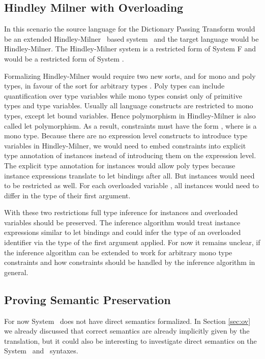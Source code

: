 \subsection{Hindley Milner with Overloading}\label{sec:hm}
In this scenario the source language for the Dictionary Passing Transform would be an extended Hindley-Milner~\cite{hm} based system \HMo\ and the target language would be Hindley-Milner. 
The Hindley-Milner system is a restricted form of System F and \HMo would be a restricted form of System \Fo. 

\noindent Formalizing Hindley-Milner would require two new sorts,  and  for mono and poly types, in favour of the sort for arbitrary types . 
Poly types can include quantification over type variables while mono types consist only of primitive types and type variables. 
Usually all language constructs are restricted to mono types, except let bound variables. 
Hence polymorphism in Hindley-Milner is also called let polymorphism.  
As a result, constraints must have the form  \Constr{:} , where  is a mono type. 
Because there are no expression level constructs to introduce type variables in Hindley-Milner, we would need to embed constraints into explicit type annotation of instances instead of introducing them on the expression level. 
The explicit type annotation for instances would allow poly types because instance expressions translate to let bindings after all.
But instances would need to be restricted as well. 
For each overloaded variable , all instances would need to differ in the type of their first argument.

\noindent With these two restrictions full type inference for instances and overloaded variables should be preserved.
The inference algorithm would treat instance expressions similar to let bindings and could infer the type of an overloaded identifier via the type of the first argument applied. 
For now it remains unclear, if the inference algorithm can be extended to work for arbitrary mono type constraints and how constraints should be handled by the inference algorithm in general.

\subsection{Proving Semantic Preservation}
For now System \Fo\ does not have direct semantics formalized. In Section \ref{sec:ov} we already discussed that correct semantics are already implicitly given by the translation, but it could also be interesting to investigate direct semantics on the System \Fo\ and \HMo\ syntaxes.

